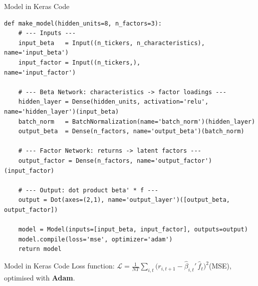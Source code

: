 \documentclass[aspectratio=169, 11pt]{beamer}
\begin{document}
%
%
\begin{frame}[fragile]{Model in Keras Code}

\begin{lstlisting}
def make_model(hidden_units=8, n_factors=3):
    # --- Inputs ---
    input_beta   = Input((n_tickers, n_characteristics), name='input_beta')
    input_factor = Input((n_tickers,),                   name='input_factor')

    # --- Beta Network: characteristics -> factor loadings ---
    hidden_layer = Dense(hidden_units, activation='relu', name='hidden_layer')(input_beta)
    batch_norm   = BatchNormalization(name='batch_norm')(hidden_layer)
    output_beta  = Dense(n_factors, name='output_beta')(batch_norm)

    # --- Factor Network: returns -> latent factors ---
    output_factor = Dense(n_factors, name='output_factor')(input_factor)

    # --- Output: dot product beta' * f ---
    output = Dot(axes=(2,1), name='output_layer')([output_beta, output_factor])

    model = Model(inputs=[input_beta, input_factor], outputs=output)
    model.compile(loss='mse', optimizer='adam')
    return model
\end{lstlisting}

\vspace{0.2cm}
\end{frame}
%
%
\begin{frame}[fragile]{Model in Keras Code}
\vspace{1cm}
Loss function: $\displaystyle\mathcal{L} = \frac{1}{NT}\sum_{i,t}\bigl(r_{i,t+1} - \hat\beta_{i,t}'\,\hat f_t\bigr)^2$\quad (MSE), optimised with \textbf{Adam}.

\end{frame}
%
%
\end{document}
